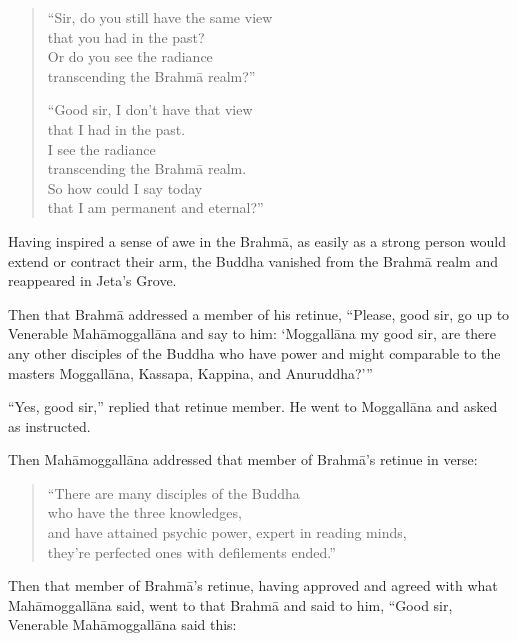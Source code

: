 \documentclass[12pt,openany]{book}%
\begin{document}
\begin{verse}%
“Sir, do you still have the same view \\
that you had in the past? \\
Or do you see the radiance \\
transcending the \textsanskrit{Brahmā} realm?” 

“Good sir, I don’t have that view \\
that I had in the past. \\
I see the radiance \\
transcending the \textsanskrit{Brahmā} realm. \\
So how could I say today \\
that I am permanent and eternal?” 

%
\end{verse}

Having inspired a sense of awe in the \textsanskrit{Brahmā}, as easily as a strong person would extend or contract their arm, the Buddha vanished from the \textsanskrit{Brahmā} realm and reappeared in Jeta’s Grove. 

Then that \textsanskrit{Brahmā} addressed a member of his retinue, “Please, good sir, go up to Venerable \textsanskrit{Mahāmoggallāna} and say to him: ‘\textsanskrit{Moggallāna} my good sir, are there any other disciples of the Buddha who have power and might comparable to the masters \textsanskrit{Moggallāna}, Kassapa, Kappina, and Anuruddha?’” 

“Yes, good sir,” replied that retinue member. He went to \textsanskrit{Moggallāna} and asked as instructed. 

Then \textsanskrit{Mahāmoggallāna} addressed that member of \textsanskrit{Brahmā}’s retinue in verse: 

\begin{verse}%
“There are many disciples of the Buddha \\
who have the three knowledges, \\
and have attained psychic power, expert in reading minds, \\
they’re perfected ones with defilements ended.” 

%
\end{verse}

Then that member of \textsanskrit{Brahmā}’s retinue, having approved and agreed with what \textsanskrit{Mahāmoggallāna} said, went to that \textsanskrit{Brahmā} and said to him, “Good sir, Venerable \textsanskrit{Mahāmoggallāna} said this: 
\end{document}
